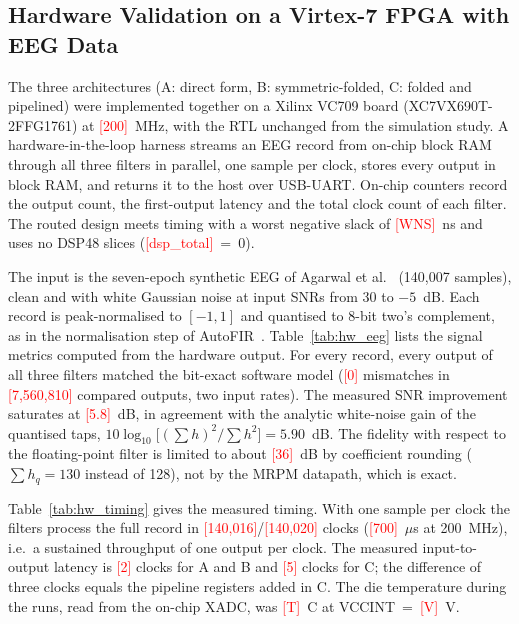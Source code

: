 \providecommand{\HW}[1]{\textcolor{red}{[#1]}}

\subsection{Hardware Validation on a Virtex-7 FPGA with EEG Data}
\label{sec:hw}

The three architectures (A: direct form, B: symmetric-folded, C: folded and
pipelined) were implemented together on a Xilinx VC709 board
(XC7VX690T-2FFG1761) at \HW{200}~MHz, with the RTL unchanged from the
simulation study. A hardware-in-the-loop harness streams an EEG record from
on-chip block RAM through all three filters in parallel, one sample per clock,
stores every output in block RAM, and returns it to the host over USB-UART.
On-chip counters record the output count, the first-output latency and the
total clock count of each filter. The routed design meets timing with a
worst negative slack of \HW{WNS}~ns and uses no DSP48 slices
(\HW{dsp\_total}~=~0).

The input is the seven-epoch synthetic EEG of Agarwal et
al.~\cite{agarwal2017} (140{,}007 samples), clean and with white Gaussian
noise at input SNRs from 30 to $-5$~dB. Each record is peak-normalised to
$[-1,1]$ and quantised to 8-bit two's complement, as in the normalisation
step of AutoFIR~\cite{liu2026autofir}. Table~\ref{tab:hw_eeg} lists the
signal metrics computed from the hardware output. For every record, every
output of all three filters matched the bit-exact software model
(\HW{0} mismatches in \HW{7,560,810} compared outputs, two input rates). The
measured SNR improvement saturates at \HW{5.8}~dB, in agreement with the
analytic white-noise gain of the quantised taps,
$10\log_{10}\!\bigl[(\sum h)^2/\sum h^2\bigr] = 5.90$~dB. The fidelity with
respect to the floating-point filter is limited to about \HW{36}~dB by
coefficient rounding ($\sum h_q = 130$ instead of 128), not by the MRPM
datapath, which is exact.

Table~\ref{tab:hw_timing} gives the measured timing. With one sample per
clock the filters process the full record in \HW{140,016}/\HW{140,020}
clocks (\HW{700}~$\mu$s at 200~MHz), i.e.\ a sustained throughput of one
output per clock. The measured input-to-output latency is \HW{2} clocks for
A and B and \HW{5} clocks for C; the difference of three clocks equals the
pipeline registers added in C. The die temperature during the runs, read
from the on-chip XADC, was \HW{T}~\textdegree C at
VCCINT~=~\HW{V}~V.

% 
